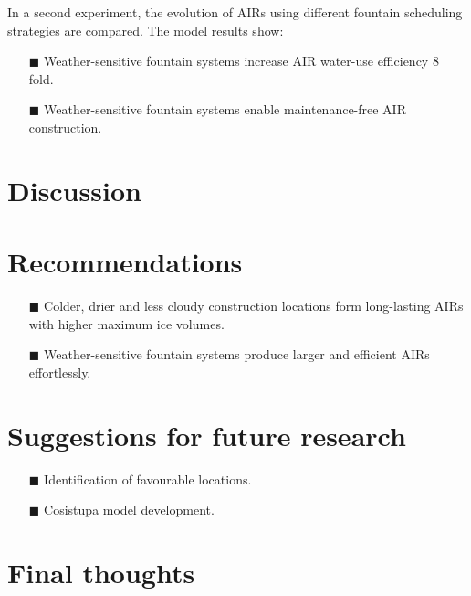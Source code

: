 In a second experiment, the evolution of AIRs using different fountain scheduling strategies are compared. The
model results show: 

\begin{itemize} 

\item[\tiny{$\blacksquare$}] Weather-sensitive fountain systems increase AIR water-use efficiency 8 fold.

\item[\tiny{$\blacksquare$}] Weather-sensitive fountain systems enable maintenance-free AIR construction.


\end{itemize}

\section{Discussion}

\section{Recommendations}

\begin{itemize} 

\item[\tiny{$\blacksquare$}] Colder, drier and less cloudy construction locations form long-lasting AIRs with
  higher maximum ice volumes. 

\item[\tiny{$\blacksquare$}] Weather-sensitive fountain systems produce larger and efficient AIRs effortlessly. 

\end{itemize}

\section{Suggestions for future research}

\begin{itemize} 

\item[\tiny{$\blacksquare$}] Identification of favourable locations.

\item[\tiny{$\blacksquare$}] Cosistupa model development.


\end{itemize}

\section{Final thoughts}
